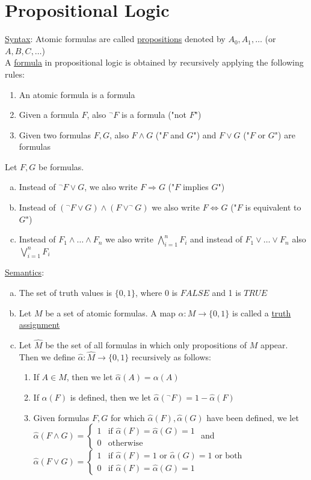 \documentclass[a4paper]{article}
\newcommand{\ul}{\underline}
\begin{document}
\section{Propositional Logic}
\ul{Syntax}:
Atomic formulas are called \ul{propositions} denoted by $A_0,A_1,\dots$ (or $A,B,C,\dots$)\\
A \ul{formula} in propositional logic is obtained by recursively applying the following rules:
\begin{enumerate}[(1)]
	\item An atomic formula is a formula
	\item Given a formula $F$, also $^\neg F$ is a formula ("not $F$")
	\item Given two formulas $F,G$, also $F\wedge G$ ("$F$ and $G$") and $F\vee G$ ("$F$ or $G$") are formulas
\end{enumerate}
Let $F,G$ be formulas.
\begin{enumerate}[(a)]
	\item Instead of $^\neg F\vee G$, we also write $F\Rightarrow G$ ("$F$ implies $G$")
	\item Instead of $(^\neg F\vee G)\wedge (F\vee ^\neg G)$ we also write $F\Leftrightarrow G$ ("$F$ is equivalent to $G$")
	\item Instead of $F_1\wedge\dots\wedge F_n$ we also write $\bigwedge_{i=1}^n F_i$ and instead of $F_1\vee\dots\vee F_n$ also $\bigvee_{i=1}^n F_i$
\end{enumerate}
\ul{Semantics}:
\begin{enumerate}[(a)]
	\item The set of truth values is $\{0,1\}$, where 0 is $FALSE$ and 1 is $TRUE$
	\item Let $M$ be a set of atomic formulas. A map $\alpha:M\rightarrow\{0,1\}$ is called a \ul{truth assignment}
	\item Let $\hat{M}$ be the set of all formulas in which only propositions of $M$ appear.\\
	Then we define $\hat{\alpha}:\hat{M}\rightarrow\{0,1\}$ recursively as follows:
	\begin{enumerate}[(1)]
		\item If $A\in M$, then we let $\hat{\alpha}(A)=\alpha(A)$
		\item If $\alpha(F)$ is defined, then we let $\hat{\alpha}(^\neg F)=1-\hat{\alpha}(F)$
		\item Given formulas $F,G$ for which $\hat{\alpha}(F),\hat{\alpha}(G)$ have been defined, we let $\hat{\alpha}(F\wedge G)=\begin{cases}
		1 & \text{if } \hat{\alpha}(F)=\hat{\alpha}(G)=1\\
		0 & \text{otherwise}
		\end{cases}$ and $\hat{\alpha}(F\vee G)=\begin{cases}
		1 & \text{if } \hat{\alpha}(F)=1 \text{ or } \hat{\alpha}(G)=1 \text{ or both}\\
		0 & \text{if } \hat{\alpha}(F)=\hat{\alpha}(G)=1
		\end{cases}$
	\end{enumerate}
\end{enumerate}
\end{document}
